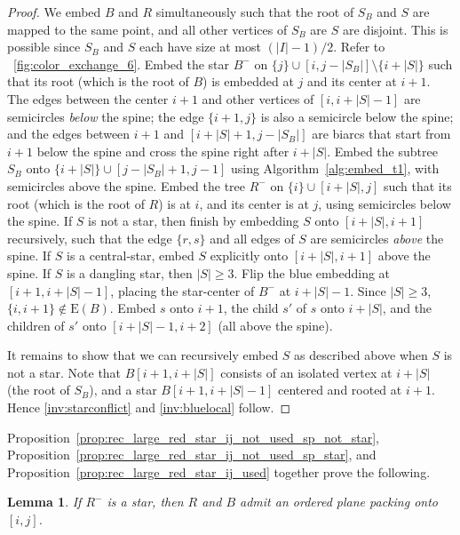 \documentclass[11pt,a4paper,colorlinks=true,urlcolor=blue,citecolor=red]{article}
\theoremstyle{plain}
\newtheorem{lemma}[theorem]{Lemma}
\newcommand{\EB}{\mathrm{E}(B)}
\begin{document}
\begin{proof}
We embed $B$ and $R$ simultaneously such that the root of $S_B$ and $S$
are mapped to the same point, and all other vertices of $S_B$ are $S$
are disjoint. This is possible since $S_B$ and $S$ each have size at
most $(|I|-1)/2$. Refer to \figurename~\ref{fig:color_exchange_6}. Embed
the star $B^-$ on $\{j\}\cup [i,j-|S_B|]\setminus \{i+|S|\}$ such
that its root (which is the root of $B$) is embedded at $j$ and its center at $i+1$.
The edges between the center $i+1$ and other vertices of $[i,i+|S|-1]$ are
semicircles \emph{below} the spine; the edge $\{i+1,j\}$ is also a semicircle below the spine;
and the edges between $i+1$ and $[i+|S|+1,j-|S_B|]$ are biarcs that start from $i+1$ below the
spine and cross the spine right after $i+|S|$.
Embed the subtree $S_B$ onto $\{i+|S|\}\cup [j-|S_B|+1,j-1]$
using Algorithm~\ref{alg:embed_t1}, with semicircles above the spine.
Embed the tree $R^-$ on $\{i\}\cup [i+|S|,j]$ such that its root (which is the root of $R$)
is at $i$, and its center is at $j$, using semicircles below the spine.
If $S$ is not a star, then finish by embedding $S$ onto $[i+|S|,i+1]$
recursively, such that the edge $\{r,s\}$ and all edges of $S$ are
semicircles \emph{above} the spine.
If $S$ is a central-star, embed $S$ explicitly onto $[i+|S|,i+1]$ above
the spine. If $S$ is a dangling star, then $|S|\geq3$. Flip the blue
embedding at $[i+1,i+|S|-1]$, placing the star-center of $B^-$ at
$i+|S|-1$. Since $|S|\geq3$, $\{i,i+1\}\not\in\EB$. Embed $s$ onto
$i+1$, the child $s'$ of $s$ onto $i+|S|$, and the children of $s'$ onto
$[i+|S|-1,i+2]$ (all above the spine).

It remains to show that we can recursively embed $S$ as described above
when $S$ is not a star.
Note that $B[i+1,i+|S|]$ consists of an isolated vertex at $i+|S|$ (the
root of $S_B$), and a star $B[i+1,i+|S|-1]$ centered and rooted at
$i+1$. Hence \ref{inv:starconflict} and \ref{inv:bluelocal} follow.
\end{proof}

Proposition~\ref{prop:rec_large_red_star_ij_not_used_sp_not_star},
Proposition~\ref{prop:rec_large_red_star_ij_not_used_sp_star}, and
Proposition~\ref{prop:rec_large_red_star_ij_used} together prove the
following.

\begin{lemma}
  \label{lem:rec_large_red_star}
  If $R^-$ is a star, then $R$ and $B$ admit an ordered plane packing
  onto $[i,j]$.
\end{lemma}
\end{document}
